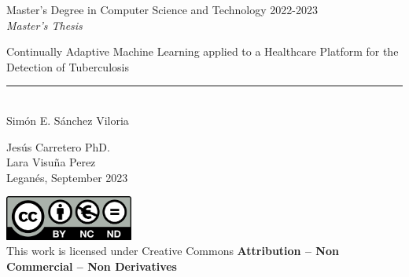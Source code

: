 \documentclass[../main.tex]{subfiles}
\begin{document}
\begin{titlepage}
	\begin{sffamily}
	\color{azulUC3M}
	\begin{center}
		\begin{figure}[H] %
		\end{figure}
		\vspace{2.5cm}
		\begin{Large}
			Master's Degree in Computer Science and Technology
			2022-2023\\
			\vspace{2cm}		
			\textsl{Master's Thesis}
			\bigskip 
			
			{\Huge 
				Continually Adaptive Machine Learning
				applied to a Healthcare Platform
				for the Detection of Tuberculosis
			}\\ %
		\end{Large}
		 	\vspace*{0.5cm}
	 		\rule{10.5cm}{0.1mm}\\
			\vspace*{0.9cm}
			{\LARGE Simón E. Sánchez Viloria }\\ 
			\vspace*{1cm}
		\begin{Large}
			Jesús Carretero PhD.\\ Lara Visuña Perez \\
			Leganés, September 2023\\ %
		\end{Large}
	\end{center}
	\vfill
	\color{black}
	\includegraphics[width=4.2cm]{figures/creativecommons.png}\\  %
	This work is licensed under Creative Commons \textbf{Attribution – Non Commercial – Non Derivatives}
	\end{sffamily}
\end{titlepage}
\end{document}
